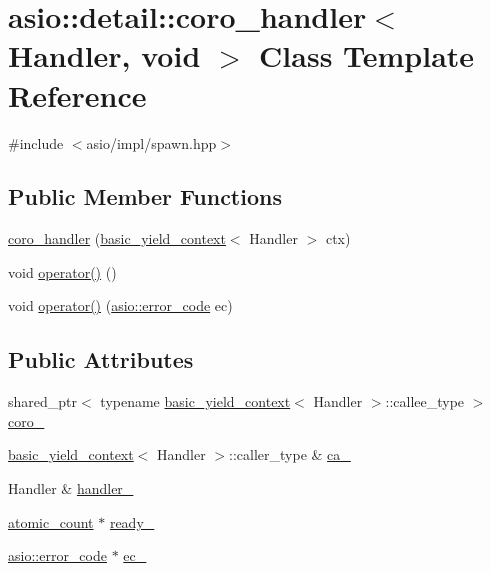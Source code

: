 \hypertarget{classasio_1_1detail_1_1coro__handler_3_01_handler_00_01void_01_4}{}\section{asio\+:\+:detail\+:\+:coro\+\_\+handler$<$ Handler, void $>$ Class Template Reference}
\label{classasio_1_1detail_1_1coro__handler_3_01_handler_00_01void_01_4}


{\ttfamily \#include $<$asio/impl/spawn.\+hpp$>$}

\subsection*{Public Member Functions}
\begin{DoxyCompactItemize}
\item 
\hyperlink{classasio_1_1detail_1_1coro__handler_3_01_handler_00_01void_01_4_abdb7f805c9b67da6800c0a1a0673bec8}{coro\+\_\+handler} (\hyperlink{classasio_1_1basic__yield__context}{basic\+\_\+yield\+\_\+context}$<$ Handler $>$ ctx)
\item 
void \hyperlink{classasio_1_1detail_1_1coro__handler_3_01_handler_00_01void_01_4_a7b5f6c3ee42d1596e93577617a85dce7}{operator()} ()
\item 
void \hyperlink{classasio_1_1detail_1_1coro__handler_3_01_handler_00_01void_01_4_ae71e62635d638e9a3b4340943b33d62c}{operator()} (\hyperlink{classasio_1_1error__code}{asio\+::error\+\_\+code} ec)
\end{DoxyCompactItemize}
\subsection*{Public Attributes}
\begin{DoxyCompactItemize}
\item 
shared\+\_\+ptr$<$ typename \hyperlink{classasio_1_1basic__yield__context}{basic\+\_\+yield\+\_\+context}$<$ Handler $>$\+::callee\+\_\+type $>$ \hyperlink{classasio_1_1detail_1_1coro__handler_3_01_handler_00_01void_01_4_ae5a8d2fe419cec49add65b2f41764d50}{coro\+\_\+}
\item 
\hyperlink{classasio_1_1basic__yield__context}{basic\+\_\+yield\+\_\+context}$<$ Handler $>$\+::caller\+\_\+type \& \hyperlink{classasio_1_1detail_1_1coro__handler_3_01_handler_00_01void_01_4_ab55025d81a89f6d47e5ed21a1df6db03}{ca\+\_\+}
\item 
Handler \& \hyperlink{classasio_1_1detail_1_1coro__handler_3_01_handler_00_01void_01_4_a207d28691946bae82598c715e8aa907c}{handler\+\_\+}
\item 
\hyperlink{namespaceasio_1_1detail_a75f94bf579dec2f59a0c4af6c4c3606e}{atomic\+\_\+count} $\ast$ \hyperlink{classasio_1_1detail_1_1coro__handler_3_01_handler_00_01void_01_4_aa491514a709f2438ba2994b0fb4304ad}{ready\+\_\+}
\item 
\hyperlink{classasio_1_1error__code}{asio\+::error\+\_\+code} $\ast$ \hyperlink{classasio_1_1detail_1_1coro__handler_3_01_handler_00_01void_01_4_a44744027260f8715b6f2e02a573b70dd}{ec\+\_\+}
\end{DoxyCompactItemize}



